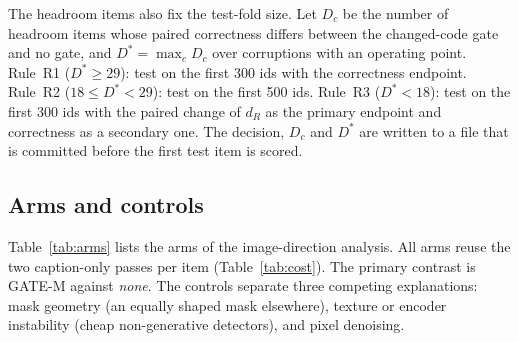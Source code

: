 The headroom items also fix the test-fold size.
Let $D_c$ be the number of headroom items whose paired correctness differs between the changed-code gate and no gate, and
$D^\ast=\max_c D_c$ over corruptions with an operating point.
Rule~R1 ($D^\ast\ge29$): test on the first 300 ids with the correctness endpoint.
Rule~R2 ($18\le D^\ast<29$): test on the first 500 ids.
Rule~R3 ($D^\ast<18$): test on the first 300 ids with the paired change of $d_R$ as the primary endpoint and correctness as a
secondary one.
The decision, $D_c$ and $D^\ast$ are written to a file that is committed before the first test item is scored.

\subsection{Arms and controls}\label{ssec:arms}
Table~\ref{tab:arms} lists the arms of the image-direction analysis.
All arms reuse the two caption-only passes per item (Table~\ref{tab:cost}).
The primary contrast is GATE-M against \emph{none}.
The controls separate three competing explanations: mask geometry (an equally shaped mask elsewhere), texture or encoder
instability (cheap non-generative detectors), and pixel denoising.

\begin{algorithm}[t]
\caption{\textsc{GeometryMatchedGate}: a random gate with the shape of the gate}\label{alg:geo}
\end{algorithm}

